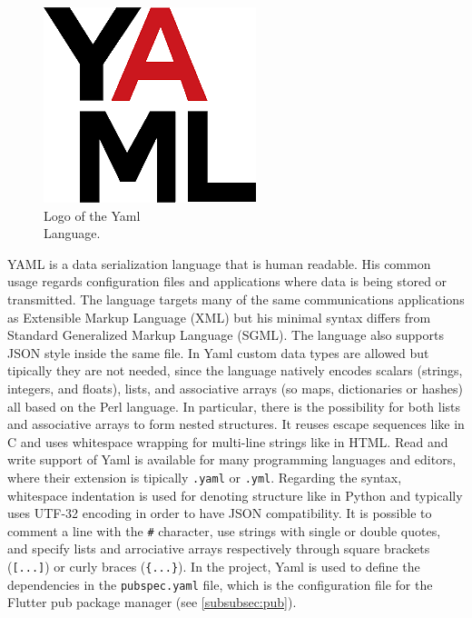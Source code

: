 \begin{figure} %
    \centering
    \includegraphics[width=\linewidth]{images/yaml.png}
    \caption{Logo of the Yaml\\Language.}
\end{figure}

YAML is a data serialization language that is human readable. His common usage regards configuration files and applications where data is being stored or transmitted. The language targets many of the same communications applications as Extensible Markup Language (XML) but his minimal syntax differs from Standard Generalized Markup Language (SGML). The language also supports JSON style inside the same file. In Yaml custom data types are allowed but tipically they are not needed, since the language natively encodes scalars (strings, integers, and floats), lists, and associative arrays (so maps, dictionaries or hashes) all based on the Perl language. In particular, there is the possibility for both lists and associative arrays to form nested structures. It reuses escape sequences like in C and uses whitespace wrapping for multi-line strings like in HTML. Read and write support of Yaml is available for many programming languages and editors, where their extension is tipically \texttt{.yaml} or \texttt{.yml}. Regarding the syntax, whitespace indentation is used for denoting structure like in Python and typically uses UTF-32 encoding in order to have JSON compatibility. It is possible to comment a line with the \texttt{\#} character, use strings with single or double quotes, and specify lists and arrociative arrays respectively through square brackets (\texttt{[...]}) or curly braces (\texttt{\{...\}})\cite{Yaml}. In the project, Yaml is used to define the dependencies in the \texttt{pubspec.yaml} file, which is the configuration file for the Flutter pub package manager (see \cref{subsubsec:pub}).

